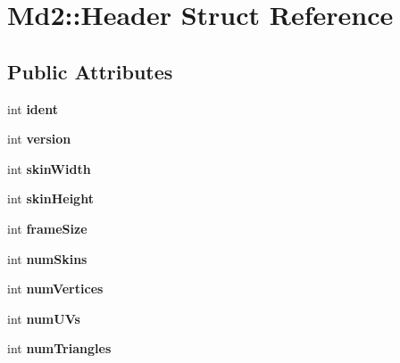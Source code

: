 \hypertarget{structMd2_1_1Header}{\section{Md2\-:\-:Header Struct Reference}
\label{structMd2_1_1Header}
}
\subsection*{Public Attributes}
\begin{DoxyCompactItemize}
\item 
\hypertarget{structMd2_1_1Header_abaa84e9184831bce4960da8bbf5ee8ce}{int {\bfseries ident}}\label{structMd2_1_1Header_abaa84e9184831bce4960da8bbf5ee8ce}

\item 
\hypertarget{structMd2_1_1Header_a987038a7d4b6de7bc6c884fe076875df}{int {\bfseries version}}\label{structMd2_1_1Header_a987038a7d4b6de7bc6c884fe076875df}

\item 
\hypertarget{structMd2_1_1Header_af69f2d69768742d2b1748610ae9c0a50}{int {\bfseries skin\-Width}}\label{structMd2_1_1Header_af69f2d69768742d2b1748610ae9c0a50}

\item 
\hypertarget{structMd2_1_1Header_a5bb777c75d66f2cf36fbe421e7e62a6b}{int {\bfseries skin\-Height}}\label{structMd2_1_1Header_a5bb777c75d66f2cf36fbe421e7e62a6b}

\item 
\hypertarget{structMd2_1_1Header_a2e0e8b7a891d476fd82d54ef9b1846f9}{int {\bfseries frame\-Size}}\label{structMd2_1_1Header_a2e0e8b7a891d476fd82d54ef9b1846f9}

\item 
\hypertarget{structMd2_1_1Header_a38aa4897dff05acb3a42cb4e0ca9186f}{int {\bfseries num\-Skins}}\label{structMd2_1_1Header_a38aa4897dff05acb3a42cb4e0ca9186f}

\item 
\hypertarget{structMd2_1_1Header_a93543ab10e9a673ae456aa86f590d1b5}{int {\bfseries num\-Vertices}}\label{structMd2_1_1Header_a93543ab10e9a673ae456aa86f590d1b5}

\item 
\hypertarget{structMd2_1_1Header_a7ac09190cadb785fe7646b614b018961}{int {\bfseries num\-U\-Vs}}\label{structMd2_1_1Header_a7ac09190cadb785fe7646b614b018961}

\item 
\hypertarget{structMd2_1_1Header_abb4061acfd3c50951f574d538f4d47f8}{int {\bfseries num\-Triangles}}\label{structMd2_1_1Header_abb4061acfd3c50951f574d538f4d47f8}


\end{DoxyCompactItemize}

